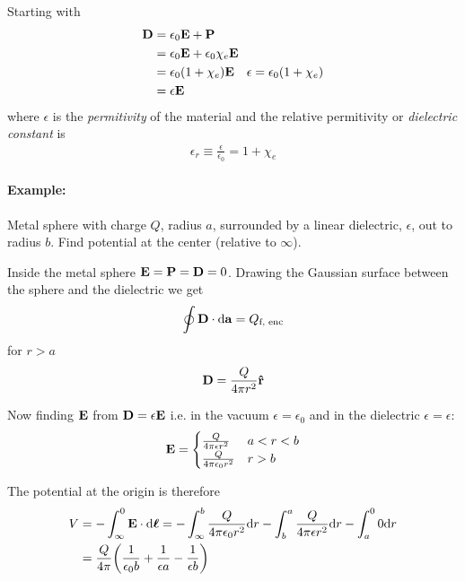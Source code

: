 \documentclass[../main.tex]{subfiles}
\begin{document}
Starting with
\begin{align*}
    \vb D &= \epsilon_0 \vb E + \vb P \\
    &= \epsilon_0 \vb E + \epsilon_0 \chi_e \vb E \\
    &= \epsilon_0 (1 + \chi_e) \vb E \quad \epsilon = \epsilon_0(1 + \chi_e) \\
    &= \epsilon \vb E
\end{align*}
where $\epsilon$ is the \textit{permitivity} of the material and the relative permitivity or \textit{dielectric constant} is
\begin{align*}
    \epsilon_r \equiv \frac{\epsilon}{\epsilon_0} = 1 + \chi_e
\end{align*}

\paragraph{Example:} Metal sphere with charge $Q$, radius $a$, surrounded by a linear dielectric,
$\epsilon$, out to radius $b$. Find potential at the center (relative to $\infty$).

Inside the metal sphere $\vb E = \vb P = \vb D = 0$.
Drawing the Gaussian surface between the sphere and the dielectric we get
\begin{align*}
    \oint \vb D \cdot \dd\vb a = Q_\text{f, enc}
\end{align*}
for $r > a$ 
\begin{align*}
    \vb D = \frac{Q}{4\pi r^2} \vu r
\end{align*}

Now finding $\vb E$ from $\vb D = \epsilon \vb E$ i.e. in the vacuum $\epsilon = \epsilon_0$ and in the dielectric $\epsilon = \epsilon$:
\begin{align*}
    \vb E = \begin{cases}
        \frac{Q}{4\pi \epsilon r^2} & a < r < b \\
        \frac{Q}{4\pi \epsilon_0 r^2} & r > b
    \end{cases}
\end{align*}

The potential at the origin is therefore
\begin{align*}
    V &= - \int_\infty^0 \vb E \cdot \dd\vb*\ell = - \int_\infty^b \frac{Q}{4\pi \epsilon_0 r^2} \dd r - \int_b^a \frac{Q}{4\pi \epsilon r^2} \dd r - \int_a^0  0 \dd r \\
    &= \frac{Q}{4\pi} \qt(
        \frac{1}{\epsilon_0 b} + \frac{1}{\epsilon a} - \frac{1}{\epsilon b}
    )
\end{align*}
\end{document}
